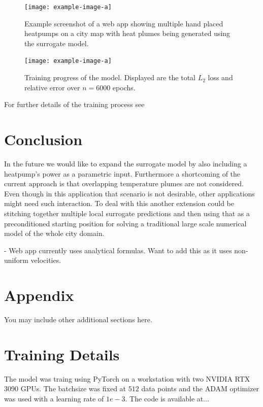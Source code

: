 \documentclass{article} %
\begin{document}


\begin{figure}[htb]
   \centering
   \texttt{[image: example-image-a]}
   \caption{Example screenshot of a web app showing multiple hand placed heatpumps on a city map with heat plumes being generated using the surrogate model.}
\end{figure}

\begin{figure}[htb]
   \centering
   \texttt{[image: example-image-a]}
   \caption{Training progress of the model. Displayed are the total $L_2$ loss and relative error over $n=6000$ epochs.}
\end{figure}

For further details of the training process see 

\section{Conclusion}
\label{sec:conclusion}




In the future we would like to expand the surrogate model by also including a heatpump's power as a parametric input.
Furthermore a shortcoming of the current approach is that overlapping temperature plumes are not considered.
Even though in this application that scenario is not desirable, other applications might need such interaction.
To deal with this another extension could be stitching together multiple local surrogate predictions and then using that as a preconditioned starting position for solving a traditional large scale numerical model of the whole city domain.

- Web app currently uses analytical formulas. Want to add this as it uses non-uniform velocities.

%




\appendix
\section{Appendix}
You may include other additional sections here.

\section{Training Details}
The model was traing using PyTorch \citep{pytorch} on a workstation with two NVIDIA RTX 3090 GPUs. The batchsize was fixed at $512$ data points and the ADAM optimizer was used with a learning rate of $1e-3$.
The code is available at...
\end{document}
